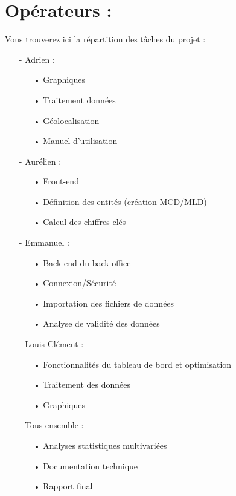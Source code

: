 \section{Opérateurs :}

Vous trouverez ici la répartition des tâches du projet :

\begin{enumerate}
	\item[-]Adrien :
	\begin{enumerate}
		\item[•] Graphiques
		\item[•] Traitement données
		\item[•] Géolocalisation
		\item[•] Manuel d'utilisation\\
	\end{enumerate}
	\item[-]Aurélien :
	\begin{enumerate}
		\item[•] Front-end
		\item[•] Définition des entités (création MCD/MLD)
		\item[•] Calcul des chiffres clés\\
	\end{enumerate}
	\item[-]Emmanuel :
	\begin{enumerate}
		\item[•] Back-end du back-office
		\item[•] Connexion/Sécurité
		\item[•] Importation des fichiers de données
		\item[•] Analyse de validité des données\\
	\end{enumerate}
	\item[-]Louis-Clément :
	\begin{enumerate}
		\item[•] Fonctionnalités du tableau de bord et optimisation
		\item[•] Traitement des données
		\item[•] Graphiques\\
	\end{enumerate}
	\item[-]Tous ensemble :
	\begin{enumerate}
		\item[•] Analyses statistiques multivariées
		\item[•] Documentation technique
		\item[•] Rapport final
	\end{enumerate}
\end{enumerate}